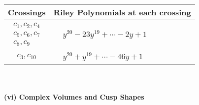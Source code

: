 \documentclass[1p]{elsarticle_modified}
\theoremstyle{definition}
\begin{document}
\begin{tabular}{m{50pt}|m{274pt}}
Crossings & \hspace{64pt}Riley Polynomials at each crossing \\
\hline $$\begin{aligned}c_{1},c_{2},c_{4}\\c_{5},c_{6},c_{7}\\c_{8},c_{9}\end{aligned}$$&$\begin{aligned}
&y^{20}-23 y^{19}+\cdots-2 y+1
\end{aligned}$\\
\hline $$\begin{aligned}c_{3},c_{10}\end{aligned}$$&$\begin{aligned}
&y^{20}+y^{19}+\cdots-46 y+1
\end{aligned}$\\
\hline
\end{tabular}\\~\\
\newpage\flushleft \textbf{(vi) Complex Volumes and Cusp Shapes}
\end{document}

